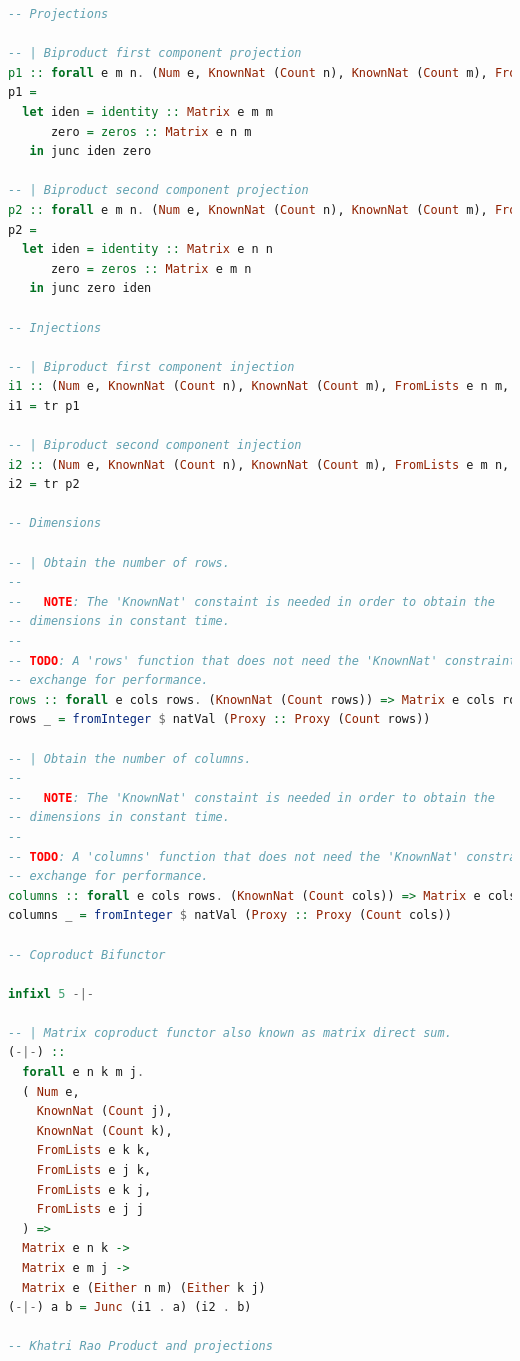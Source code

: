 \documentclass[
  oneside,
  11pt, a4paper,
  footinclude=true,
  headinclude=true,
  cleardoublepage=empty
]{scrbook}
\theoremstyle{definition}
\theoremstyle{definition}
\begin{document}
\begin{lstlisting}[language=Haskell, caption={Matrix.Internal},captionpos=b]
-- Projections

-- | Biproduct first component projection
p1 :: forall e m n. (Num e, KnownNat (Count n), KnownNat (Count m), FromLists e n m, FromLists e m m) => Matrix e (Either m n) m
p1 =
  let iden = identity :: Matrix e m m
      zero = zeros :: Matrix e n m
   in junc iden zero

-- | Biproduct second component projection
p2 :: forall e m n. (Num e, KnownNat (Count n), KnownNat (Count m), FromLists e m n, FromLists e n n) => Matrix e (Either m n) n
p2 =
  let iden = identity :: Matrix e n n
      zero = zeros :: Matrix e m n
   in junc zero iden

-- Injections

-- | Biproduct first component injection
i1 :: (Num e, KnownNat (Count n), KnownNat (Count m), FromLists e n m, FromLists e m m) => Matrix e m (Either m n)
i1 = tr p1

-- | Biproduct second component injection
i2 :: (Num e, KnownNat (Count n), KnownNat (Count m), FromLists e m n, FromLists e n n) => Matrix e n (Either m n)
i2 = tr p2

-- Dimensions

-- | Obtain the number of rows.
--
--   NOTE: The 'KnownNat' constaint is needed in order to obtain the
-- dimensions in constant time.
--
-- TODO: A 'rows' function that does not need the 'KnownNat' constraint in
-- exchange for performance.
rows :: forall e cols rows. (KnownNat (Count rows)) => Matrix e cols rows -> Int
rows _ = fromInteger $ natVal (Proxy :: Proxy (Count rows))

-- | Obtain the number of columns.
-- 
--   NOTE: The 'KnownNat' constaint is needed in order to obtain the
-- dimensions in constant time.
--
-- TODO: A 'columns' function that does not need the 'KnownNat' constraint in
-- exchange for performance.
columns :: forall e cols rows. (KnownNat (Count cols)) => Matrix e cols rows -> Int
columns _ = fromInteger $ natVal (Proxy :: Proxy (Count cols))

-- Coproduct Bifunctor

infixl 5 -|-

-- | Matrix coproduct functor also known as matrix direct sum.
(-|-) ::
  forall e n k m j.
  ( Num e,
    KnownNat (Count j),
    KnownNat (Count k),
    FromLists e k k,
    FromLists e j k,
    FromLists e k j,
    FromLists e j j
  ) =>
  Matrix e n k ->
  Matrix e m j ->
  Matrix e (Either n m) (Either k j)
(-|-) a b = Junc (i1 . a) (i2 . b)

-- Khatri Rao Product and projections


\end{lstlisting}
\end{document}

